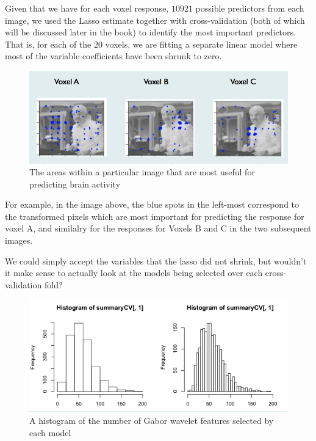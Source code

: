 Given that we have for each voxel response, $10921$ possible predictors from each image, we used the Lasso estimate together with cross-validation (both of which will be discussed later in the book) to identify the most important predictors. That is, for each of the 20 voxels, we are fitting a separate linear model where most of the variable coefficients have been shrunk to zero.

\begin{figure}[H]
\begin{center}
\includegraphics[scale=0.5]{voxel.png}
\end{center}
\caption{The areas within a particular image that are most useful for predicting brain activity}
\label{fig:image}
\end{figure}


For example, in the image above, the blue spots in the left-most correspond to the transformed pixels which are most important for predicting the response for voxel A, and similalry for the responses for Voxels B and C in the two subsequent images.

We could simply accept the variables that the lasso did not shrink, but wouldn't it make sense to actually look at the models being selected over each cross-validation fold?

\begin{figure}[H]
\begin{center}
\includegraphics[scale=0.4]{voxelhist.png}
\end{center}
\caption{A histogram of the number of Gabor wavelet features selected by each model}
\label{fig:voxelhist}
\end{figure}

